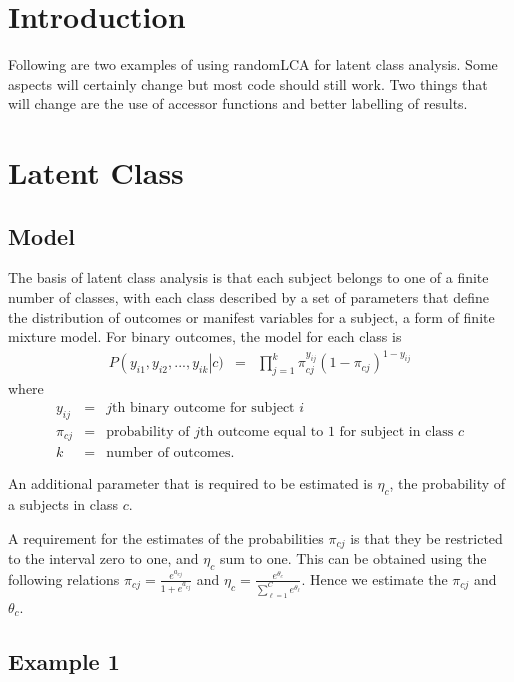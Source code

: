 
\section{Introduction}

Following are two examples of using randomLCA for latent class analysis. Some aspects will certainly change but most code should still work. Two things that will change are the use of accessor functions and better labelling of results.

\section{Latent Class}

\subsection{Model}

The basis of latent class analysis is that each subject belongs to one of a finite number of classes, with each class described by a set of parameters that define the distribution of outcomes or manifest variables for a subject, a form of finite mixture model. For binary outcomes, the model for each class is
\begin{eqnarray*}
P\left(y_{i1},y_{i2},...,y_{ik}\right|c)&=&\prod_{j=1}^k \pi_{cj}^{y_{ij}} \left(1-\pi_{cj}\right)^{1-y_{ij}}
\end{eqnarray*}
where
\begin{eqnarray*}
y_{ij}&=&\mbox{$j$th binary outcome for subject $i$}\\
\pi_{cj}&=&\mbox{probability of $j$th outcome equal to 1 for subject in class $c$}\\
k&=&\mbox{number of outcomes.}
\end{eqnarray*}

An additional parameter that is required to be estimated is $\eta_c$, the probability of a subjects in class $c$.

A requirement for the estimates of the probabilities $\pi_{cj}$ is that they be restricted to the interval zero to one, and $\eta_c$ sum to one. This can be obtained using the following relations $\pi_{cj}=\frac{e^{a_{cj}}}{1+e^{a_{cj}}}$ and $\eta_c=\frac{e^{\theta_c}}{\sum_{\ell=1}^C e^{\theta_\ell}}$. Hence we estimate the $\pi_{cj}$ and $\theta_c$.


\subsection{Example 1}


